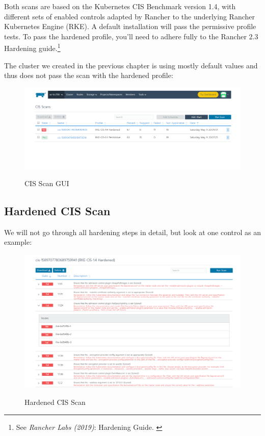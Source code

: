 Both scans are based on the Kubernetes CIS Benchmark version 1.4, with different sets of enabled controls adapted by Rancher to the underlying Rancher Kubernetes Engine (RKE). A default installation will pass the permissive profile tests. To pass the hardened profile, you'll need to adhere fully to the Rancher 2.3 Hardening guide.\footnote{See \textit{Rancher Labs (2019)}: Hardening Guide. \cite{hardeningGuide}}

The cluster we created in the previous chapter is using mostly default values and thus does not pass the scan with the hardened profile:

\begin{figure}[H]
\centering
\caption {CIS Scan GUI}
\includegraphics[width=\linewidth]{images/cis-scan-overview.png}
\label{fig:cisScanOverview}
\end{figure}

\subsection{Hardened CIS Scan}

We will not go through all hardening steps in detail, but look at one control as an example:

\begin{figure}[H]
\centering
\caption {Hardened CIS Scan}
\includegraphics[width=\linewidth]{images/cis-scan-fail.png}
\label{fig:cisScanFail}
\end{figure}

